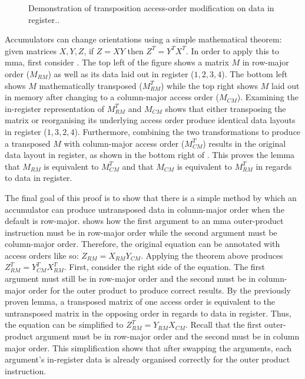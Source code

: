 \documentclass[\main/thesis.tex]{subfiles}
\begin{document}
\begin{figure}[t]
  \caption[Effects of Transposition and Access-Order Modification]{Demonstration of transposition access-order modification on data in register..}
  \label{fig:orderAndTranspose}
\end{figure}

Accumulators can change orientations using a simple mathematical theorem: given matrices $X, Y, Z$, if $Z = XY$ then $Z^T=Y^TX^T$.
In order to apply this to \gls{mma}, first consider .
The top left of the figure shows a matrix $M$ in row-major order ($M_{RM}$) as well as its data laid out in register ($1, 2, 3, 4$).
The bottom left shows $M$ mathematically transposed ($M_{RM}^T$) while the top right shows $M$ laid out in memory after changing to a column-major access order ($M_{CM}$).
Examining the in-register representation of $M_{RM}^T$ and $M_{CM}$ shows that either transposing the matrix or reorganising its underlying access order produce identical data layouts in register ($1, 3, 2, 4$).
Furthermore, combining the two transformations to produce a transposed $M$ with column-major access order ($M_{CM}^T$) results in the original data layout in register, as shown in the bottom right of .
This proves the lemma that $M_{RM}$ is equivalent to $M^T_{CM}$ and that $M_{CM}$ is equivalent to $M^T_{RM}$ in regards to data in register.

The final goal of this proof is to show that there is a simple method by which an accumulator can produce untransposed data in column-major order when the default is row-major.
 shows how the first argument to an \gls{mma} outer-product instruction must be in row-major order while the second argument must be column-major order.
Therefore, the original equation can be annotated with access orders like so: $Z_{RM} = X_{RM} Y_{CM}$.
Applying the theorem above produces $Z^T_{RM} = Y^T_{CM} X^T_{RM}$.
First, consider the right side of the equation.
The first argument must still be in row-major order and the second must be in column-major order for the outer product to produce correct results.
By the previously proven lemma, a transposed matrix of one access order is equivalent to the untransposed matrix in the opposing order in regards to data in register.
Thus, the equation can be simplified to $Z^T_{RM} = Y_{RM}X_{CM}$.
Recall that the first outer-product argument must be in row-major order and the second must be in column major order.
This simplification shows that after swapping the arguments, each argument's in-register data is already organised correctly for the outer product instruction.
\end{document}
